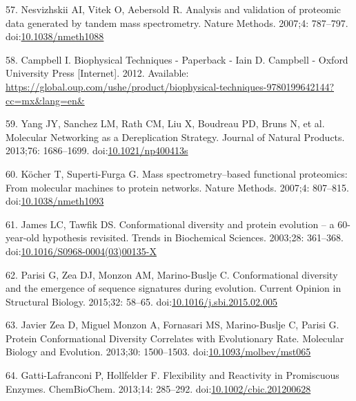 \documentclass[12pt,twoside]{reedthesis}
\begin{document}
  \hypertarget{ref-nesvizhskiiux5fanalysisux5f2007}{}
  57. Nesvizhskii AI, Vitek O, Aebersold R. Analysis and validation of
  proteomic data generated by tandem mass spectrometry. Nature Methods.
  2007;4: 787--797.
  doi:\href{https://doi.org/10.1038/nmeth1088}{10.1038/nmeth1088}
  
  \hypertarget{ref-campbellux5fbiophysicalux5f2012}{}
  58. Campbell I. Biophysical Techniques - Paperback - Iain D. Campbell -
  Oxford University Press {[}Internet{]}. 2012. Available:
  \url{https://global.oup.com/ushe/product/biophysical-techniques-9780199642144?cc=mx\&lang=en\&}
  
  \hypertarget{ref-yangux5fmolecularux5f2013}{}
  59. Yang JY, Sanchez LM, Rath CM, Liu X, Boudreau PD, Bruns N, et al.
  Molecular Networking as a Dereplication Strategy. Journal of Natural
  Products. 2013;76: 1686--1699.
  doi:\href{https://doi.org/10.1021/np400413s}{10.1021/np400413s}
  
  \hypertarget{ref-kocherux5fmassux5f2007}{}
  60. Köcher T, Superti-Furga G. Mass spectrometry--based functional
  proteomics: From molecular machines to protein networks. Nature Methods.
  2007;4: 807--815.
  doi:\href{https://doi.org/10.1038/nmeth1093}{10.1038/nmeth1093}
  
  \hypertarget{ref-jamesux5fconformationalux5f2003}{}
  61. James LC, Tawfik DS. Conformational diversity and protein evolution
  -- a 60-year-old hypothesis revisited. Trends in Biochemical Sciences.
  2003;28: 361--368.
  doi:\href{https://doi.org/10.1016/S0968-0004(03)00135-X}{10.1016/S0968-0004(03)00135-X}
  
  \hypertarget{ref-parisiux5fconformationalux5f2015}{}
  62. Parisi G, Zea DJ, Monzon AM, Marino-Buslje C. Conformational
  diversity and the emergence of sequence signatures during evolution.
  Current Opinion in Structural Biology. 2015;32: 58--65.
  doi:\href{https://doi.org/10.1016/j.sbi.2015.02.005}{10.1016/j.sbi.2015.02.005}
  
  \hypertarget{ref-javierux5fzeaux5fproteinux5f2013}{}
  63. Javier Zea D, Miguel Monzon A, Fornasari MS, Marino-Buslje C, Parisi
  G. Protein Conformational Diversity Correlates with Evolutionary Rate.
  Molecular Biology and Evolution. 2013;30: 1500--1503.
  doi:\href{https://doi.org/10.1093/molbev/mst065}{10.1093/molbev/mst065}
  
  \hypertarget{ref-gatti-lafranconiux5fflexibilityux5f2013}{}
  64. Gatti-Lafranconi P, Hollfelder F. Flexibility and Reactivity in
  Promiscuous Enzymes. ChemBioChem. 2013;14: 285--292.
  doi:\href{https://doi.org/10.1002/cbic.201200628}{10.1002/cbic.201200628}
  
\end{document}
